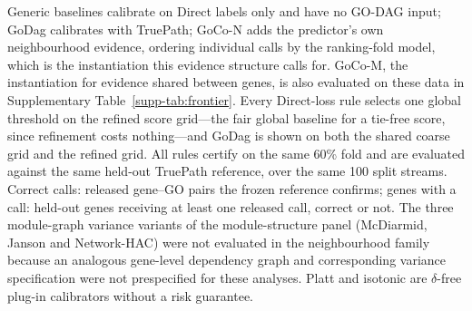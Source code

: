 \begin{table}[htbp]
\par\vspace{3pt}\begin{minipage}{\linewidth}\footnotesize Generic baselines calibrate on Direct labels only and have no GO-DAG input; GoDag calibrates with TruePath; GoCo-N adds the predictor's own neighbourhood evidence, ordering individual calls by the ranking-fold model, which is the instantiation this evidence structure calls for. GoCo-M, the instantiation for evidence shared between genes, is also evaluated on these data in Supplementary Table~\ref{supp-tab:frontier}. Every Direct-loss rule selects one global threshold on the refined score grid---the fair global baseline for a tie-free score, since refinement costs nothing---and GoDag is shown on both the shared coarse grid and the refined grid. All rules certify on the same 60\% fold and are evaluated against the same held-out TruePath reference, over the same 100 split streams. Correct calls: released gene--GO pairs the frozen reference confirms; genes with a call: held-out genes receiving at least one released call, correct or not. The three module-graph variance variants of the module-structure panel (McDiarmid, Janson and Network-HAC) were not evaluated in the neighbourhood family because an analogous gene-level dependency graph and corresponding variance specification were not prespecified for these analyses. Platt and isotonic are $\delta$-free plug-in calibrators without a risk guarantee.\end{minipage}
\end{table}
